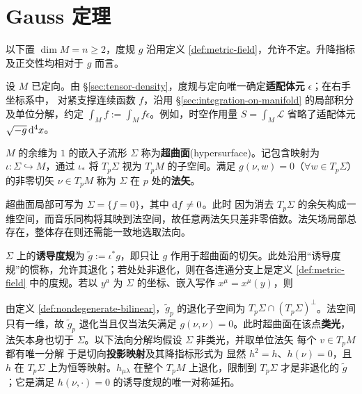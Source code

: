\section{Gauss 定理}

以下置 $\dim M=n\geqslant2$，度规 $g$ 沿用定义 \ref{def:metric-field}，允许不定。升降指标及正交性均相对于 $g$ 而言。

设 $M$ 已定向。由 \S\ref{sec:tensor-density}，度规与定向唯一确定\textbf{适配体元} $\epsilon$；在右手坐标系中，
对紧支撑连续函数 $f$，沿用 \S\ref{sec:integration-on-manifold} 的局部积分及单位分解，约定 $\int_M f:=\int_M f\epsilon$。例如，时空作用量 $S=\int_M\mathcal L$ 省略了适配体元 $\sqrt{-g}\,\dd[4]x$。

\begin{definition}
    $M$ 的余维为 $1$ 的嵌入子流形 $\Sigma$ 称为\textbf{超曲面}(hypersurface)。记包含映射为 $\iota:\Sigma\hookrightarrow M$，通过 $\iota_*$ 将 $T_p\Sigma$ 视为 $T_pM$ 的子空间。满足 $g(\nu,w)=0$（$\forall w\in T_p\Sigma$）的非零切矢 $\nu\in T_pM$ 称为 $\Sigma$ 在 $p$ 处的\textbf{法矢}。
\end{definition}

超曲面局部可写为 $\Sigma=\{f=0\}$，其中 $\dd f\ne0$。此时
因为消去 $T_p\Sigma$ 的余矢构成一维空间，而音乐同构将其映到法空间，故任意两法矢只差非零倍数。法矢场局部总存在，整体存在则还需能一致地选取法向。

\begin{definition}
    $\Sigma$ 上的\textbf{诱导度规}为 $\tilde g:=\iota^*g$，即只让 $g$ 作用于超曲面的切矢。此处沿用“诱导度规”的惯称，允许其退化；若处处非退化，则在各连通分支上是定义 \ref{def:metric-field} 中的度规。若以 $y^a$ 为 $\Sigma$ 的坐标、嵌入写作 $x^\mu=x^\mu(y)$，则
\end{definition}

由定义 \ref{def:nondegenerate-bilinear}，$\tilde g_p$ 的退化子空间为 $T_p\Sigma\cap(T_p\Sigma)^\perp$。法空间只有一维，故 $\tilde g_p$ 退化当且仅当法矢满足 $g(\nu,\nu)=0$。此时超曲面在该点\textbf{类光}，法矢本身也切于 $\Sigma$。以下法向分解均假设 $\Sigma$ 非类光，并取单位法矢
每个 $v\in T_pM$ 都有唯一分解
于是切向\textbf{投影映射}及其降指标形式为
显然 $h^2=h$、$h(\nu)=0$，且 $h$ 在 $T_p\Sigma$ 上为恒等映射。$h_{\mu\lambda}$ 在整个 $T_pM$ 上退化，限制到 $T_p\Sigma$ 才是非退化的 $\tilde g$；它是满足 $h(\nu,\cdot)=0$ 的诱导度规的唯一对称延拓。

